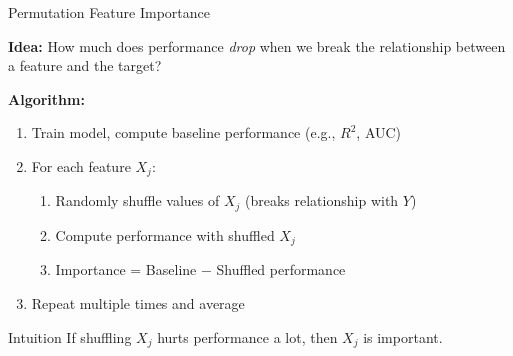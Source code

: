 \documentclass[10pt]{beamer}
\begin{document}
\begin{frame}{Permutation Feature Importance}

  \textbf{Idea:} How much does performance \emph{drop} when we break the relationship between a feature and the target?

  \vspace{1em}
  \textbf{Algorithm:}
  \begin{enumerate}
    \item Train model, compute baseline performance (e.g., $R^2$, AUC)
    \item For each feature $X_j$:
    \begin{enumerate}
      \item Randomly shuffle values of $X_j$ (breaks relationship with $Y$)
      \item Compute performance with shuffled $X_j$
      \item Importance = Baseline $-$ Shuffled performance
    \end{enumerate}
    \item Repeat multiple times and average
  \end{enumerate}

  \vspace{0.5em}
  \begin{block}{Intuition}
    If shuffling $X_j$ hurts performance a lot, then $X_j$ is important.
  \end{block}
\end{frame}

\end{document}
